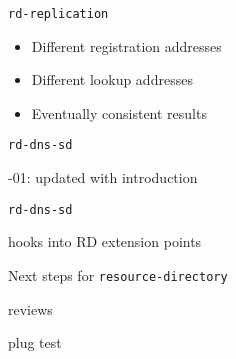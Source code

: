 \documentclass{beamer}
\begin{document}
\begin{frame}{\texttt{rd-replication}}
	\begin{itemize}
		\item Different registration addresses
		\item Different lookup addresses
		\item Eventually consistent results
	\end{itemize}

	{\small }
\end{frame}

\begin{frame}{\texttt{rd-dns-sd}}\begin{center}\Huge
	-01: updated with introduction
\end{center}\end{frame}

\begin{frame}{\texttt{rd-dns-sd}}\begin{center}\Huge
	hooks into RD extension points
\end{center}\end{frame}

\begin{frame}{Next steps for \texttt{resource-directory}}\begin{center}\Huge
	reviews

	\vspace{1cm}

	plug test
\end{center}\end{frame}
\end{document}
